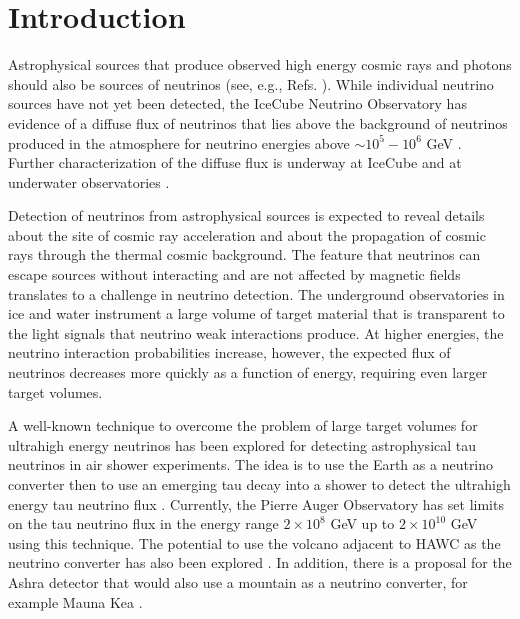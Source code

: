 \documentclass[aps,10pt,twocolumn,tightenlines]{revtex4-1}
\begin{document}
\maketitle 




\section{Introduction}

Astrophysical sources that produce observed 
high energy cosmic rays and photons should also be sources of neutrinos (see, e.g., Refs. \cite{Gaisser:1994yf,Katz:2011ke,Anchordoqui:2013dnh}). While individual neutrino
sources have not yet been detected, the IceCube Neutrino Observatory 
has evidence of a diffuse flux of neutrinos that lies above the background
of neutrinos produced in the atmosphere for neutrino 
energies above $\sim 10^5-10^6$ GeV \cite{Aartsen:2013eka}. Further characterization of the diffuse flux is underway at IceCube and at underwater
observatories \cite{Fusco:2016vil}.  

Detection of neutrinos from astrophysical sources is expected 
to reveal details about the site of cosmic ray acceleration and about the 
propagation of cosmic rays through the thermal cosmic background. 
The feature that neutrinos can escape sources without interacting and are not 
 affected by magnetic fields translates to a challenge in neutrino detection.  
The underground observatories in ice and water instrument a large volume of target material that is transparent to the light signals that neutrino weak interactions produce. At higher energies, the neutrino interaction probabilities increase, however, the expected flux of neutrinos decreases more quickly as a function of energy, requiring even larger target volumes.

A well-known technique to overcome the problem of large target volumes for 
ultrahigh energy neutrinos has been explored for detecting 
astrophysical tau neutrinos 
 in air shower experiments. 
The idea is to use the Earth as a neutrino converter then to use an 
emerging tau decay into a shower to detect the ultrahigh energy tau neutrino flux \cite{Domokos:1997ve,Fargion_2004,Fargion:2000iz,Fargion:2003kn,Athar:2000rx,Feng:2001ue,Kusenko:2001gj,Hou:2002bh,Tseng:2003pn,Aramo:2004pr,PalomaresRuiz:2005xw}.
Currently, the Pierre Auger Observatory has set limits on the 
tau neutrino flux in the energy range $2\times 10^{8}$ GeV up to 
$2\times 10^{10}$ GeV 
\cite{Abraham:2009uy, Abreu:2012zz} using this technique. 
The potential to use the volcano adjacent to HAWC as the neutrino 
converter has also been explored \cite{Vargas:2016hcp}. 
In addition, there is a proposal for the Ashra detector that would also use a 
mountain as a neutrino converter, 
for example Mauna Kea \cite{Asaoka:2012em}.
\end{document}
